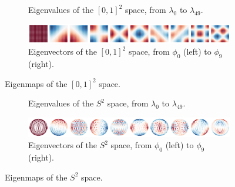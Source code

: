 \documentclass{article}
\begin{document}
\begin{figure}[h!]
    \centering
    \begin{subfigure}[b]{0.9\textwidth}
        \centering
        \caption{Eigenvalues of the $[0,1]^2$ space, from $\lambda_0$ to $\lambda_{49}$.}
    \end{subfigure}
    \hfill
    \begin{subfigure}[b]{\textwidth}
        \centering
        \includegraphics[width=\textwidth]{Images/r2_eigenvecs.png}
        \caption{Eigenvectors of the $[0,1]^2$ space, from $\phi_0$ (left) to $\phi_9$ (right).}
    \end{subfigure}
    \caption{Eigenmaps of the $[0,1]^2$ space.}
    \label{fig:r2_eigenmaps}
\end{figure}



\begin{figure}[h!]
    \centering
    \begin{subfigure}[b]{0.9\textwidth}
        \centering
        \caption{Eigenvalues of the $S^2$ space, from $\lambda_0$ to $\lambda_{49}$.}
    \end{subfigure}
    \hfill
    \begin{subfigure}[b]{\textwidth}
        \centering
        \includegraphics[width=\textwidth]{Images/s2_eigenvecs.png}
        \caption{Eigenvectors of the $S^2$ space, from $\phi_0$ (left) to $\phi_9$ (right).}
    \end{subfigure}
    \caption{Eigenmaps of the $S^2$ space.}
    \label{fig:s2_eigenmaps}
\end{figure}
\end{document}
